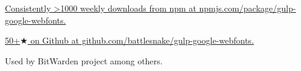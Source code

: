 \documentclass[a4paper]{twentysecondcv}
\begin{document}
\begin{twenty}
{		\par%
		\href{https://www.npmjs.com/package/gulp-google-webfonts}{%
			Consistently >1000 weekly downloads from npm at npmjs.com/package/gulp-google-webfonts.%
		}%
		\par%
		\href{https://github.com/battlesnake/gulp-google-webfonts}{%
			50+$\bigstar$ on Github at github.com/battlesnake/gulp-google-webfonts.%
		}%
		\par%
		Used by BitWarden project among others.%
	}
\end{twenty}

\end{document}
